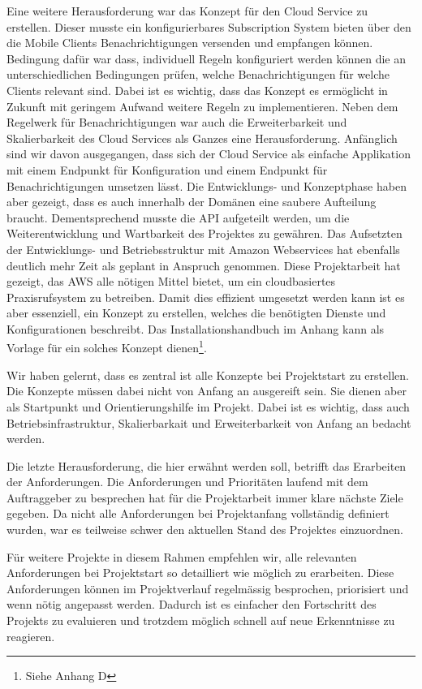 Eine weitere Herausforderung war das Konzept für den Cloud Service zu erstellen.
Dieser musste ein konfigurierbares Subscription System bieten über den die Mobile Clients Benachrichtigungen versenden und empfangen können.
Bedingung dafür war dass, individuell Regeln konfiguriert werden können die an unterschiedlichen Bedingungen prüfen, welche Benachrichtigungen für welche Clients relevant sind.
Dabei ist es wichtig, dass das Konzept es ermöglicht in Zukunft mit geringem Aufwand weitere Regeln zu implementieren.
Neben dem Regelwerk für Benachrichtigungen war auch die Erweiterbarkeit und Skalierbarkeit des Cloud Services als Ganzes eine Herausforderung.
Anfänglich sind wir davon ausgegangen, dass sich der Cloud Service als einfache Applikation mit einem Endpunkt für Konfiguration und einem Endpunkt für Benachrichtigungen umsetzen lässt.
Die Entwicklungs- und Konzeptphase haben aber gezeigt, dass es auch innerhalb der Domänen eine saubere Aufteilung braucht.
Dementsprechend musste die API aufgeteilt werden, um die Weiterentwicklung und Wartbarkeit des Projektes zu gewähren.
Das Aufsetzten der Entwicklungs- und Betriebsstruktur mit Amazon Webservices hat ebenfalls deutlich mehr Zeit als geplant in Anspruch genommen.
Diese Projektarbeit hat gezeigt, das AWS alle nötigen Mittel bietet, um ein cloudbasiertes Praxisrufsystem zu betreiben.
Damit dies effizient umgesetzt werden kann ist es aber essenziell, ein Konzept zu erstellen, welches die benötigten Dienste und Konfigurationen beschreibt.
Das Installationshandbuch im Anhang kann als Vorlage für ein solches Konzept dienen\footnote{Siehe Anhang D}.

Wir haben gelernt, dass es zentral ist alle Konzepte bei Projektstart zu erstellen.
Die Konzepte müssen dabei nicht von Anfang an ausgereift sein.
Sie dienen aber als Startpunkt und Orientierungshilfe im Projekt.
Dabei ist es wichtig, dass auch Betriebsinfrastruktur, Skalierbarkait und Erweiterbarkeit von Anfang an bedacht werden.

Die letzte Herausforderung, die hier erwähnt werden soll, betrifft das Erarbeiten der Anforderungen.
Die Anforderungen und Prioritäten laufend mit dem Auftraggeber zu besprechen hat für die Projektarbeit immer klare nächste Ziele gegeben.
Da nicht alle Anforderungen bei Projektanfang vollständig definiert wurden, war es teilweise schwer den aktuellen Stand des Projektes einzuordnen.

Für weitere Projekte in diesem Rahmen empfehlen wir, alle relevanten Anforderungen bei Projektstart so detailliert wie möglich zu erarbeiten.
Diese Anforderungen können im Projektverlauf regelmässig besprochen, priorisiert und wenn nötig angepasst werden.
Dadurch ist es einfacher den Fortschritt des Projekts zu evaluieren und trotzdem möglich schnell auf neue Erkenntnisse zu reagieren.

\clearpage
